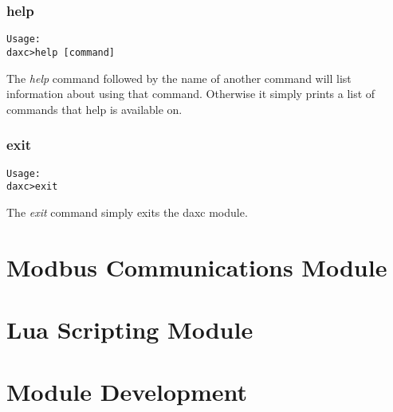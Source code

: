 \documentclass[10pt,letterpaper]{report}
\begin{document}
\subsection{help}
\begin{verbatim}
Usage:
daxc>help [command]
\end{verbatim}

The \textit{help} command followed by the name of another command will list information about using that command. Otherwise it simply prints a list of commands that help is available on.

\subsection{exit}
\begin{verbatim}
Usage:
daxc>exit
\end{verbatim}
The \textit{exit} command simply exits the daxc module.

\chapter{Modbus Communications Module}

\chapter{Lua Scripting Module}


\chapter{Module Development}
\end{document}
